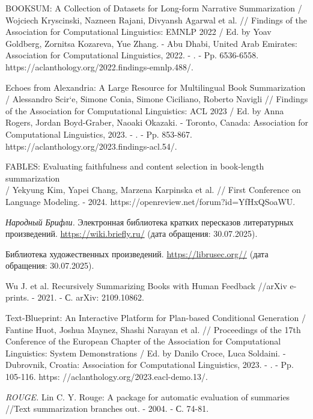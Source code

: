 \documentclass{superfri}
\begin{document}
\openaccess


\begin{thebibliography}{99}
BOOKSUM: A Collection of Datasets for Long-form Narrative Summarization / Wojciech Kryscinski, Nazneen Rajani, Divyansh Agarwal et al. // Findings of the Association for Computational Linguistics: EMNLP 2022 / Ed. by Yoav Goldberg, Zornitsa Kozareva, Yue Zhang. - Abu Dhabi, United Arab Emirates: Association for Computational Linguistics, 2022. - . - Pp. 6536-6558. https://aclanthology.org/2022.findings-emnlp.488/.

Echoes from Alexandria: A Large Resource for Multilingual Book Summarization / Alessandro Scir`e, Simone Conia, Simone Ciciliano, Roberto Navigli // Findings of the Association for Computational Linguistics: ACL 2023 / Ed. by Anna Rogers, Jordan Boyd-Graber, Naoaki Okazaki. - Toronto, Canada: Association for Computational Linguistics, 2023. - . - Pp. 853-867. https://aclanthology.org/2023.findings-acl.54/.

FABLES: Evaluating faithfulness and content selection in book-length summarization \\/ Yekyung Kim, Yapei Chang, Marzena Karpinska et al. // First Conference on Language Modeling. - 2024. https://openreview.net/forum?id=YfHxQSoaWU.

\textit{Народный Брифли.}  
Электронная библиотека кратких пересказов литературных произведений.  
\url{https://wiki.briefly.ru/} (дата обращения: 30.07.2025).

Библиотека художественных произведений.  
\url{https://librusec.org//} (дата обращения: 30.07.2025).

Wu J. et al. Recursively Summarizing Books with Human Feedback //arXiv e-prints. - 2021. - С. arXiv: 2109.10862.

Text-Blueprint: An Interactive Platform for Plan-based Conditional Generation / \\Fantine Huot, Joshua Maynez, Shashi Narayan et al. // Proceedings of the 17th Conference of the European Chapter of the Association for Computational Linguistics:
System Demonstrations / Ed. by Danilo Croce, Luca Soldaini. - Dubrovnik, Croatia: Association for Computational Linguistics, 2023. - . - Pp. 105-116. https:
//aclanthology.org/2023.eacl-demo.13/.

\textit{ROUGE.}
Lin C. Y. Rouge: A package for automatic evaluation of summaries //Text summarization branches out. - 2004. - С. 74-81.


\end{thebibliography}
\end{document}
